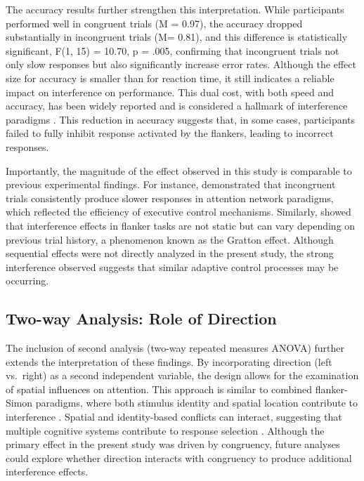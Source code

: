 \documentclass[
  authoryear,
  preprint]{elsarticle}
\begin{document}
The accuracy results further strengthen this interpretation. While
participants performed well in congruent trials (M = 0.97), the accuracy
dropped substantially in incongruent trials (M= 0.81), and this
difference is statistically significant, F(1, 15) = 10.70, p = .005,
confirming that incongruent trials not only slow responses but also
significantly increase error rates. Although the effect size for
accuracy is smaller than for reaction time, it still indicates a
reliable impact on interference on performance. This dual cost, with
both speed and accuracy, has been widely reported and is considered a
hallmark of interference paradigms \citep{ridderinkhof2004}. This
reduction in accuracy suggests that, in some cases, participants failed
to fully inhibit response activated by the flankers, leading to
incorrect responses.

Importantly, the magnitude of the effect observed in this study is
comparable to previous experimental findings. For instance,
\citet{fan2002} demonstrated that incongruent trials consistently
produce slower responses in attention network paradigms, which reflected
the efficiency of executive control mechanisms. Similarly,
\citet{gratton1992} showed that interference effects in flanker tasks
are not static but can vary depending on previous trial history, a
phenomenon known as the Gratton effect. Although sequential effects were
not directly analyzed in the present study, the strong interference
observed suggests that similar adaptive control processes may be
occurring.

\subsection{Two-way Analysis: Role of
Direction}\label{two-way-analysis-role-of-direction}

The inclusion of second analysis (two-way repeated measures ANOVA)
further extends the interpretation of these findings. By incorporating
direction (left vs.~right) as a second independent variable, the design
allows for the examination of spatial influences on attention. This
approach is similar to combined flanker-Simon paradigms, where both
stimulus identity and spatial location contribute to interference
\citep{stoffels1988}. Spatial and identity-based conflicts can interact,
suggesting that multiple cognitive systems contribute to response
selection \citep{hommel1993}. Although the primary effect in the present
study was driven by congruency, future analyses could explore whether
direction interacts with congruency to produce additional interference
effects.
\end{document}
